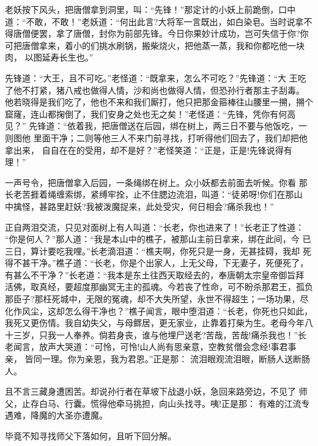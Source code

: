 老妖按下风头，把唐僧拿到洞里，叫：“先锋！”那定计的小妖上前跪倒，口中
道：“不敢，不敢！”老妖道：“何出此言?大将军一言既出，如白染皂。当时说拿不
得唐僧便罢，拿了唐僧，封你为前部先锋。今日你果妙计成功，岂可失信于你?你
可把唐僧拿来，着小的们挑水刷锅，搬柴烧火，把他蒸一蒸，我和你都吃他一块肉，
以图延寿长生也。”

先锋道：“大王，且不可吃。”老怪道：“既拿来，怎么不可吃？”先锋道：“大
王吃了他不打紧，猪八戒也做得人情，沙和尚也做得人情，但恐孙行者那主子刮毒。
他若晓得是我们吃了，他也不来和我们厮打，他只把那金箍棒往山腰里一搠，搠个
窟窿，连山都掬倒了，我们安身之处也无之矣！”老怪道：“先锋，凭你有何高见？”
先锋道：“依着我，把唐僧送在后园，绑在树上，两三日不要与他饭吃，一则图他
里面干净；二则等他三人不来门前寻找，打听得他们回去了，我们却把他拿出来，
自自在在的受用，却不是好？”老怪笑道：“正是，正是!先锋说得有理！”

一声号令，把唐僧拿入后园，一条绳绑在树上。众小妖都去前面去听候。你看
那长老苦捱着绳缠索绑，紧缚牢拴，止不住腮边流泪，叫道：“徒弟呀!你们在那山
中擒怪，甚路里赶妖?我被泼魔捉来，此处受灾，何日相会?痛杀我也！”

正自两泪交流，只见对面树上有人叫道：“长老，你也进来了！”长老正了性道：
“你是何人？”那人道：“我是本山中的樵子，被那山主前日拿来，绑在此间，今
已三日，算计要吃我哩。”长老滴泪道：“樵夫啊，你死只是一身，无甚挂碍，我却
死得不甚干净。”樵子道：“长老，你是个出家人，上无父母，下无妻子，死便死了，
有甚么不干净？”长老道：“我本是东土往西天取经去的，奉唐朝太宗皇帝御旨拜
活佛，取真经，要超度那幽冥无主的孤魂。今若丧了性命，可不盼杀那君王，孤负
那臣子?那枉死城中，无限的冤魂，却不大失所望，永世不得超生；一场功果，尽
化作风尘，这却怎么得干净也？”樵子闻言，眼中堕泪道：“长老，你死也只如此，
我死又更伤情。我自幼失父，与母鳏居，更无家业，止靠着打柴为生。老母今年八
十三岁，只我一人奉养。倘若身丧，谁与他埋尸送老?苦哉，苦哉!痛杀我也！”长
老闻言，放声大哭道：“可怜，可怜!山人尚有思亲意，空教贫僧会念经!事君事亲，
皆同一理。你为亲恩，我为君恩。”正是那：
流泪眼观流泪眼，断肠人送断肠人。

且不言三藏身遭困苦。却说孙行者在草坡下战退小妖，急回来路旁边，不见了
师父，止存白马、行囊。慌得他牵马挑担，向山头找寻。咦!正是那：
有难的江流专遇难，降魔的大圣亦遭魔。

毕竟不知寻找师父下落如何，且听下回分解。